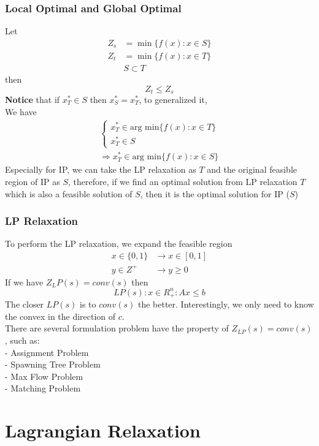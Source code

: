 				\subsection{Local Optimal and Global Optimal}
					Let 
					\begin{align}
						Z_s &= \min \{f(x):x\in S\} \\
						Z_t &= \min \{f(x):x\in T\}  \\
						& S \subset T 
					\end{align}
					then\\
					\begin{equation}Z_t \le Z_s  \end{equation}
					\textbf{Notice} that if $x_T^* \in S$ then $x_S^*=x_T^*$, to generalized it, \\
					We have
					\begin{align}
						\begin{cases}x_T^* \in \text{arg min} \{f(x): x\in T\} \\ x_T^* \in S\end{cases} \\ \Rightarrow x_T^*\in \text{arg min} \{f(x): x\in S\} 
					\end{align}
					Especially for IP, we can take the LP relaxation as $T$ and the original feasible region of IP as $S$, therefore, if we find an optimal solution from LP relaxation $T$ which is also a feasible solution of $S$, then it is the optimal solution for IP ($S$)

				\subsection{LP Relaxation}
					To perform the LP relaxation, we expand the feasible region
					\begin{align}
						x \in \{0,1\} & \rightarrow x\in [0, 1]  \\
						y\in Z^+ & \rightarrow y \ge 0 
					\end{align}
					If we have $Z_LP(s) = conv(s)$ then
					\begin{equation} LP(s): {x\in R_+^n: Ax\le b}\end{equation}
					The closer $LP(s)$ is to $conv(s)$ the better. Interestingly, we only need to know the convex in the direction of $c$.\\
					There are several formulation problem have the property of $Z_{LP}(s) = conv(s)$, such as:\\
					\indent- Assignment Problem\\
					\indent- Spawning Tree Problem\\
					\indent- Max Flow Problem\\
					\indent- Matching Problem

		\chapter{Lagrangian Relaxation}

